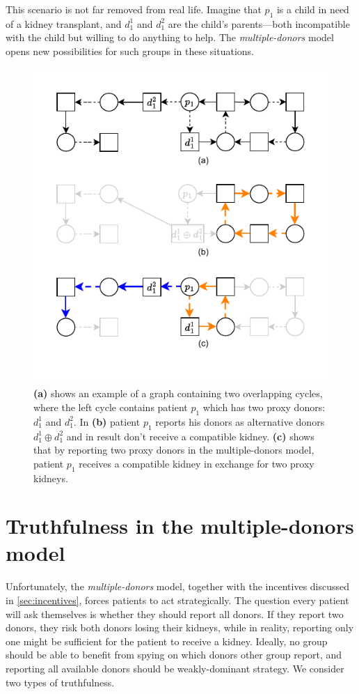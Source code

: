 This scenario is not far removed from real life. Imagine that $p_1$ is a child in need of a kidney transplant, and $d_1^1$ and $d_1^2$ are the child’s parents—both incompatible with the child but willing to do anything to help. The \textit{multiple-donors} model opens new possibilities for such groups in these situations.

\begin{figure}
    \centering
    \includegraphics{data/incentive_motivation_example2.pdf}
    \caption[An example showing the benefit of reporting two proxy donors in multiple-donors model]{\textbf{(a)} shows an example of a graph containing two overlapping cycles, where the left cycle contains patient $p_1$ which has two proxy donors: $d_1^1$ and $d_1^2$. In \textbf{(b)} patient $p_1$ reports his donors as alternative donors $d_1^1 \oplus d_1^2$ and in result don't receive a compatible kidney. \textbf{(c)} shows that by reporting two proxy donors in the multiple-donors model, patient $p_1$ receives a compatible kidney in exchange for two proxy kidneys.}
    \label{fig:incentive_motivation_example2}
\end{figure}

\section{Truthfulness in the multiple-donors model}
Unfortunately, the \textit{multiple-donors} model, together with the incentives discussed in \autoref{sec:incentives}, forces patients to act strategically. The question every patient will ask themselves is whether they should report all donors. If they report two donors, they risk both donors losing their kidneys, while in reality, reporting only one might be sufficient for the patient to receive a kidney.  Ideally, no group should be able to benefit from spying on which donors other group report, and reporting all available donors should be weakly-dominant strategy. We consider two types of truthfulness.

